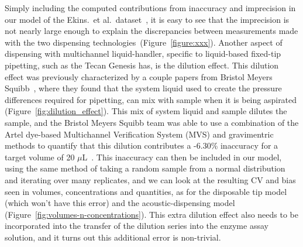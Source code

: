 \documentclass[aps,pre,twocolumn,nofootinbib,superscriptaddress,linenumbers]{revtex4-1}
\begin{document}
Simply including the computed contributions from inaccuracy and imprecision in our model of the  Ekins.~et al.~dataset~\cite{ekins}, it is easy to see that the imprecision is not nearly large enough to explain the discrepancies between measurements made with the two dispensing technologies~(Figure~\ref{figure:xxx}).
Another aspect of dispensing with multichannel liquid-handler, specific to liquid-based fixed-tip pipetting, such as the Tecan Genesis has, is the dilution effect. 
This dilution effect was previously characterized by a couple papers from Bristol Meyers Squibb~\cite{dong_use_2006,gu_dilution_2007}, where they found that the system liquid used to create the pressure differences required for pipetting, can mix with sample when it is being aspirated (Figure~\ref{fig:dilution_effect}). 
This mix of system liquid and sample dilutes the sample, and the Bristol Meyers Squibb team was able to use a combination of the Artel dye-based Multichannel Verification System (MVS) and gravimentric methods to quantify that this dilution contributes a -6.30\% inaccuracy for a target volume of 20 $\mu$L~\cite{dong_use_2006}.
This inaccuracy can then be included in our model, using the same method of taking a random sample from a normal distribution and iterating over many replicates, and we can look at the resulting CV and bias seen in volumes, concentrations and quantities, as for the disposable tip model (which won't have this error) and the acoustic-dispensing model (Figure~\ref{fig:volumes-n-concentrations}).
This extra dilution effect also needs to be incorporated into the transfer of the dilution series into the enzyme assay solution, and it turns out this additional error is non-trivial.
\end{document}
